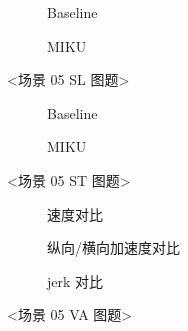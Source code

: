 \begin{figure}[H]
\centering
\begin{subfigure}[b]{\textwidth}
  \centering
  
  \caption{Baseline}
  \label{fig:exp_05_crossing_ped_cmp_sl:a}
\end{subfigure}

\begin{subfigure}[b]{\textwidth}
  \centering
  
  \caption{MIKU}
  \label{fig:exp_05_crossing_ped_cmp_sl:b}
\end{subfigure}
\caption{<场景 05 SL 图题>}
\label{fig:exp_05_crossing_ped_cmp_sl}
\end{figure}

\begin{figure}[H]
\centering
\begin{subfigure}[b]{0.48\textwidth}
  \centering
  
  \caption{Baseline}
  \label{fig:exp_05_crossing_ped_cmp_st:a}
\end{subfigure}\hfill
\begin{subfigure}[b]{0.48\textwidth}
  \centering
  
  \caption{MIKU}
  \label{fig:exp_05_crossing_ped_cmp_st:b}
\end{subfigure}
\caption{<场景 05 ST 图题>}
\label{fig:exp_05_crossing_ped_cmp_st}
\end{figure}

\begin{figure}[H]
\centering
\begin{subfigure}[b]{\textwidth}
  \centering
  
  \caption{速度对比}
  \label{fig:exp_05_crossing_ped_cmp_va:a}
\end{subfigure}

\begin{subfigure}[b]{\textwidth}
  \centering
  
  \caption{纵向/横向加速度对比}
  \label{fig:exp_05_crossing_ped_cmp_va:b}
\end{subfigure}

\begin{subfigure}[b]{\textwidth}
  \centering
  
  \caption{jerk 对比}
  \label{fig:exp_05_crossing_ped_cmp_va:c}
\end{subfigure}
\caption{<场景 05 VA 图题>}
\label{fig:exp_05_crossing_ped_cmp_va}
\end{figure}

